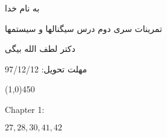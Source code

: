 \documentclass[50pt]{article}
\newcommand{\hl}{
\begin{center}
\line(1,0){450}
\end{center}}
\begin{document}
\setLTR 




\begin{RTL}
\Large{








\begin{center}
به نام خدا

تمرینات سری دوم درس سیگنالها و سیستمها

دکتر لطف الله بیگی

مهلت تحویل: 97/12/12
\end{center}

\hl
\begin{latin}
Chapter 1:

$27,28,30,41,42$
\end{latin}






}





\end{RTL}
\end{document}
